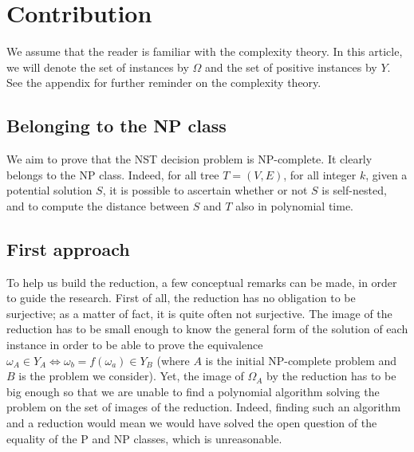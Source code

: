 \newcommand\variable{\emph{variable}\xspace}
\newcommand\variables{\emph{variables}\xspace}
\newcommand\widget{\emph{widget}\xspace}
\newcommand\widgets{\emph{widgets}\xspace}
\newcommand\constraint{\emph{constraint}\xspace}
\newcommand\constraints{\emph{constraints}\xspace}

\section{Contribution}

We assume that the reader is familiar with the complexity theory. In
this article, we will denote the set of instances by $\Omega$ and the
set of positive instances by $Y$. See the appendix for further
reminder on the complexity theory.

\subsection{Belonging to the NP class}

We aim to prove that the NST decision problem is NP-complete. It
clearly belongs to the NP class. Indeed, for all tree $T = (V,E)$, for
all integer $k$, given a potential solution $S$, it is possible to
ascertain whether or not $S$ is self-nested, and to compute the
distance between $S$ and $T$ also in polynomial time.

\noindent\hrulefill

\subsection{First approach}
To help us build the reduction, a few conceptual remarks can be made,
in order to guide the research. First of all, the reduction has no
obligation to be surjective; as a matter of fact, it is quite often
not surjective. The image of the reduction has to be small enough to
know the general form of the solution of each instance in order to be
able to prove the equivalence
$\omega_{A} \in Y_{A} \Leftrightarrow \omega_{b} = f(\omega_{a}) \in
Y_{B}$
(where $A$ is the initial NP-complete problem and $B$ is the problem
we consider). Yet, the image of $\Omega_{A}$ by the reduction has
to be big enough so that we are unable to find a polynomial algorithm
solving the problem on the set of images of the reduction. Indeed,
finding such an algorithm and a reduction would mean we would have
solved the open question of the equality of the P and NP classes,
which is unreasonable.


